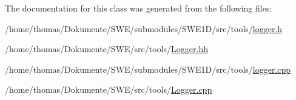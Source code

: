 The documentation for this class was generated from the following files\-:\begin{DoxyCompactItemize}
\item 
/home/thomas/\-Dokumente/\-S\-W\-E/submodules/\-S\-W\-E1\-D/src/tools/\hyperlink{logger_8h}{logger.\-h}\item 
/home/thomas/\-Dokumente/\-S\-W\-E/src/tools/\hyperlink{Logger_8hh}{Logger.\-hh}\item 
/home/thomas/\-Dokumente/\-S\-W\-E/submodules/\-S\-W\-E1\-D/src/tools/\hyperlink{logger_8cpp}{logger.\-cpp}\item 
/home/thomas/\-Dokumente/\-S\-W\-E/src/tools/\hyperlink{Logger_8cpp}{Logger.\-cpp}\end{DoxyCompactItemize}
